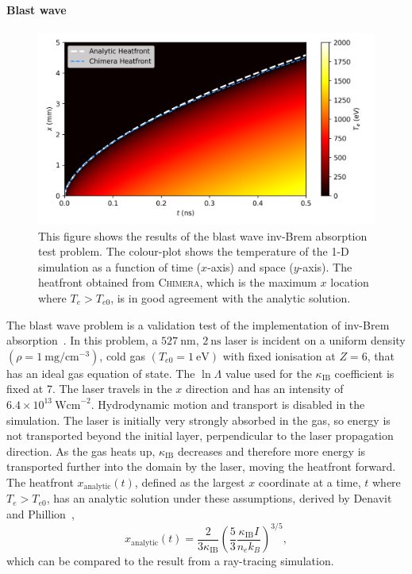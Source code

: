 \paragraph*{Blast wave}

\begin{figure}[t!]
    \includegraphics[width=0.9\linewidth]{Numerics/Images/blastwave.png}
    \centering
    \caption{This figure shows the results of the blast wave \ac{inv-Brem} absorption test problem.
    The colour-plot shows the temperature of the 1-D simulation as a function of time ($x$-axis) and space ($y$-axis).
    The heatfront obtained from \textsc{Chimera}, which is the maximum $x$ location where $T_e>T_{e0}$, is in good agreement with the analytic solution.}%
    \label{fig:SOLAS_blastwave}
\end{figure}

The blast wave problem is a validation test of the implementation of \ac{inv-Brem} absorption~\cite{denavit_laser_1994,haines_coupling_2020}.
In this problem, a $527\ \text{nm}$, $2\ \text{ns}$ laser is incident on a uniform density $(\rho = 1\ \text{mg}/\text{cm}^{-3})$, cold gas $(T_{e0} = 1\ \text{eV})$ with fixed ionisation at $Z=6$, that has an ideal gas equation of state.
The $\ln{\Lambda}$ value used for the $\kappa_{\text{IB}}$ coefficient is fixed at 7.
The laser travels in the $x$ direction and has an intensity of $6.4\times 10^{13}\ \text{Wcm}^{-2}$.
Hydrodynamic motion and transport is disabled in the simulation.
The laser is initially very strongly absorbed in the gas, so energy is not transported beyond the initial layer, perpendicular to the laser propagation direction.
As the gas heats up, $\kappa_{\text{IB}}$ decreases and therefore more energy is transported further into the domain by the laser, moving the heatfront forward.
The heatfront $x_{\text{analytic}}(t)$, defined as the largest $x$ coordinate at a time, $t$ where $T_e>T_{e0}$, has an analytic solution under these assumptions, derived by Denavit and Phillion~\cite{denavit_laser_1994},
\begin{equation}
    x_{\text{analytic}}(t) = \frac{2}{3\kappa_{\text{IB}}}\left( \frac{5}{3} \frac{\kappa_{\text{IB}}I}{n_e k_B} \right)^{3/5},
\end{equation}
which can be compared to the result from a ray-tracing simulation.


